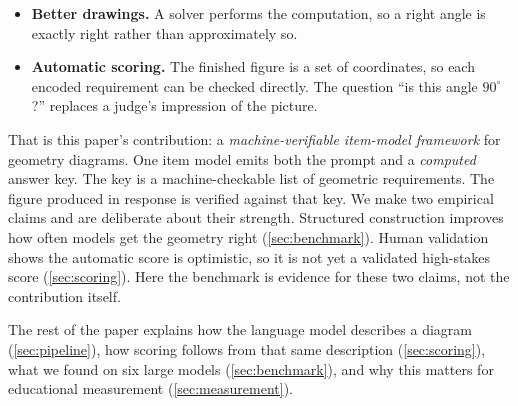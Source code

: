 \begin{itemize}
\item \textbf{Better drawings.} A solver performs the computation, so a right angle is exactly right rather than approximately so.
\item \textbf{Automatic scoring.} The finished figure is a set of coordinates, so each encoded requirement can be checked directly. The question ``is this angle $90^\circ$?'' replaces a judge's impression of the picture.
\end{itemize}

That is this paper's contribution: a \emph{machine-verifiable item-model framework} for geometry diagrams. One item model emits both the prompt and a \emph{computed} answer key. The key is a machine-checkable list of geometric requirements. The figure produced in response is verified against that key. We make two empirical claims and are deliberate about their strength. Structured construction improves how often models get the geometry right (\cref{sec:benchmark}). Human validation shows the automatic score is optimistic, so it is not yet a validated high-stakes score (\cref{sec:scoring}). Here the benchmark is evidence for these two claims, not the contribution itself.

The rest of the paper explains how the language model describes a diagram (\cref{sec:pipeline}), how scoring follows from that same description (\cref{sec:scoring}), what we found on six large models (\cref{sec:benchmark}), and why this matters for educational measurement (\cref{sec:measurement}).
